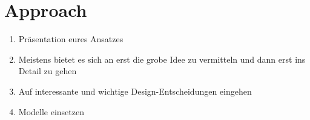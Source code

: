 \section{Approach} \label{approach}

\begin{enumerate}
	\item Präsentation eures Ansatzes
	\item Meistens bietet es sich an erst die grobe Idee zu vermitteln und dann erst ins Detail zu gehen
	\item Auf interessante und wichtige Design-Entscheidungen eingehen
	\item Modelle einsetzen
\end{enumerate}
